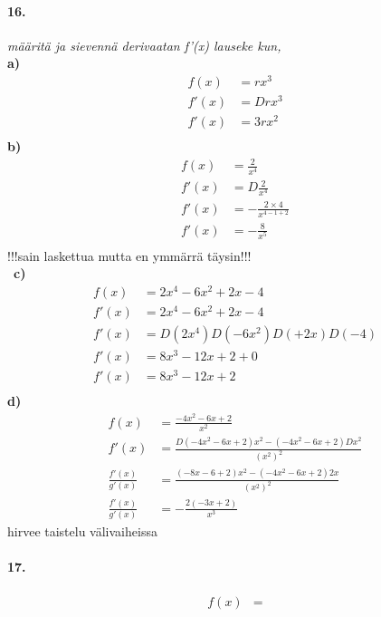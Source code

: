 \documentclass[12pt, a4paper]{article}
\begin{document}
\paragraph*{16.}
    \textit{
        määritä ja sievennä derivaatan f'(x) lauseke kun,
    }
    \\
    \textbf{a)}
    \begin{equation*}
        \begin{split}
            f(x)&=rx^3\\
            f'(x)&=Drx^3\\
            f'(x)&=3rx^2\\
        \end{split}
    \end{equation*}
    \textbf{b)}
    \begin{equation*}
        \begin{split}
            f(x)&=\frac{2}{x^4}\\
            f'(x)&=D\frac{2}{x^4}\\
            f'(x)&=-\frac{2\times 4}{x^{4-1+2}}\\
            f'(x)&=-\frac{8}{x^{5}}\\
        \end{split}
    \end{equation*}
    !!!sain laskettua mutta en ymmärrä täysin!!!\\\
    \textbf{c)}
    \begin{equation*}
        \begin{split}
            f(x)&=2x^4-6x^2+2x-4\\
            f'(x)&=2x^4-6x^2+2x-4\\
            f'(x)&=D(2x^4)D(-6x^2)D(+2x)D(-4)\\
            f'(x)&=8x^3-12x+2+0\\
            f'(x)&=8x^3-12x+2\\
        \end{split}
    \end{equation*}
    \textbf{d)}
    \begin{equation*}
        \begin{split}
            f(x)&=\frac{-4x^2-6x+2}{x^2}\\
            f'(x)&=\frac{D(-4x^2-6x+2)x^2-(-4x^2-6x+2)Dx^2}{(x^2)^2}\\
            \frac{f'(x)}{g'(x)}&=\frac{(-8x-6+2)x^2-(-4x^2-6x+2)2x}{(x^2)^2}\\
            \frac{f'(x)}{g'(x)}&=-\frac{2(-3x+2)}{x^3}
        \end{split}
    \end{equation*}
    hirvee taistelu välivaiheissa
    \newpage
    \paragraph*{17.}
    \begin{equation*}
        \begin{split}
            f(x)&=
        \end{split}
    \end{equation*}
\end{document}
